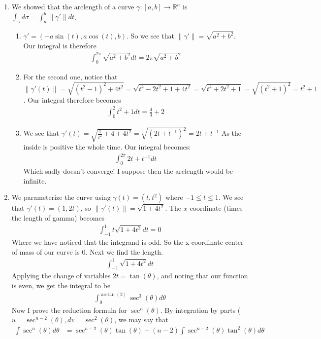 \documentclass[12pt]{article}
\theoremstyle{definition}
\theoremstyle{remark}
\newcommand{\R}{\mathbb{R}}
\newcommand{\mg}[1]{\| #1 \|}
\begin{document}
\begin{enumerate}[leftmargin=\labelsep]
		\item We showed that the arclength of a curve $\gamma: [a,b] \to \R^n$ is $\int_\gamma d\sigma = \int_a^b \mg{\gamma'}dt$.
		\begin{enumerate}
			\item $\gamma' = (-a\sin(t), a\cos(t), b)$. So we see that $\mg{\gamma'} = \sqrt{a^2+b^2}$. Our integral is therefore
			\begin{align*}
				\int_0^{2\pi} \sqrt{a^2+b^2}dt = 2\pi \sqrt{a^2+b^2}
			\end{align*}
			\item For the second one, notice that $\mg{\gamma'(t)} = \sqrt{(t^2-1)^2+4t^2} = \sqrt{t^4-2t^2+1+4t^2}=\sqrt{t^4+2t^2+1}=\sqrt{(t^2+1)^2}=t^2+1$. Our integral therefore becomes
			\begin{align*}
				\int_0^2 t^2+1dt = \frac43+2
			\end{align*}
			\item 
			We see that $\gamma'(t) = \sqrt{\frac1{t^2}+4+4t^2}=\sqrt{(2t+t^{-1})^2} = 2t+t^{-1}$ As the inside is positive the whole time. Our integral becomes:
			\begin{align*}
				\int_0^{2\pi} 2t+t^{-1} dt
			\end{align*}
			Which sadly doesn't converge! I suppose then the arclength would be infinite.
		\end{enumerate}
		\item 
		We parameterize the curve using $\gamma(t) = (t, t^2)$ where $-1 \leq t \leq 1$. We see that $\gamma'(t) = (1, 2t)$, so $\mg{\gamma'(t)} = \sqrt{1+4t^2}$. The $x$-coordinate (times the length of gamma) becomes
		\begin{align*}
			\int_{-1}^1 t\sqrt{1+4t^2}dt = 0
		\end{align*}
		Where we have noticed that the integrand is odd. So the x-coordinate center of mass of our curve is 0. Next we find the length.
		\begin{align*}
			\int_{-1}^1 \sqrt{1+4t^2}dt
		\end{align*}
		Applying the change of variables $2t = \tan(\theta)$, and noting that our function is even, we get the integral to be
		\begin{align*}
			\int_0^{\arctan(2)} \sec^3(\theta)d\theta
		\end{align*}
		Now I prove the reduction formula for $\sec^n(\theta)$. By integration by parts ($u = \sec^{n-2}(\theta), dv=\sec^2(\theta)$, we may say that
		\begin{align*}
			\int \sec^n(\theta)d\theta &= \sec^{n-2}(\theta)\tan(\theta) - (n-2)\int \sec^{n-2}(\theta)\tan^2(\theta)d\theta \\

\end{align*}
\end{enumerate}
\end{document}

